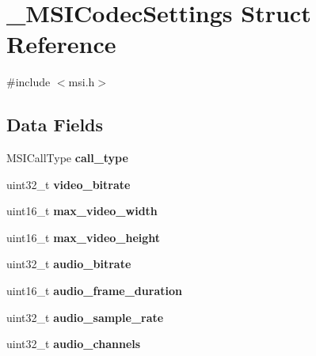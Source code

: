 \hypertarget{struct___m_s_i_codec_settings}{\section{\+\_\+\+M\+S\+I\+Codec\+Settings Struct Reference}
\label{struct___m_s_i_codec_settings}
}


{\ttfamily \#include $<$msi.\+h$>$}

\subsection*{Data Fields}
\begin{DoxyCompactItemize}
\item 
\hypertarget{struct___m_s_i_codec_settings_a24d841d0ab8a0b3f12f559aec494e4fe}{M\+S\+I\+Call\+Type {\bfseries call\+\_\+type}}\label{struct___m_s_i_codec_settings_a24d841d0ab8a0b3f12f559aec494e4fe}

\item 
\hypertarget{struct___m_s_i_codec_settings_af0eac99d4181795e8a595d244e745192}{uint32\+\_\+t {\bfseries video\+\_\+bitrate}}\label{struct___m_s_i_codec_settings_af0eac99d4181795e8a595d244e745192}

\item 
\hypertarget{struct___m_s_i_codec_settings_ab81ecded1f7c46e120c8f2afa7b2c5cc}{uint16\+\_\+t {\bfseries max\+\_\+video\+\_\+width}}\label{struct___m_s_i_codec_settings_ab81ecded1f7c46e120c8f2afa7b2c5cc}

\item 
\hypertarget{struct___m_s_i_codec_settings_a4fef4b2fa1a8ae8446314ad0af4ce698}{uint16\+\_\+t {\bfseries max\+\_\+video\+\_\+height}}\label{struct___m_s_i_codec_settings_a4fef4b2fa1a8ae8446314ad0af4ce698}

\item 
\hypertarget{struct___m_s_i_codec_settings_a5d9a8b59b2eb1eef8dbdcb032bf1dd01}{uint32\+\_\+t {\bfseries audio\+\_\+bitrate}}\label{struct___m_s_i_codec_settings_a5d9a8b59b2eb1eef8dbdcb032bf1dd01}

\item 
\hypertarget{struct___m_s_i_codec_settings_a61b592233f5a65705eb2600d38e365cd}{uint16\+\_\+t {\bfseries audio\+\_\+frame\+\_\+duration}}\label{struct___m_s_i_codec_settings_a61b592233f5a65705eb2600d38e365cd}

\item 
\hypertarget{struct___m_s_i_codec_settings_a66da4482e934a2700e07a39fa0838559}{uint32\+\_\+t {\bfseries audio\+\_\+sample\+\_\+rate}}\label{struct___m_s_i_codec_settings_a66da4482e934a2700e07a39fa0838559}

\item 
\hypertarget{struct___m_s_i_codec_settings_a1b04e9669a2929f425e867440b6d826d}{uint32\+\_\+t {\bfseries audio\+\_\+channels}}\label{struct___m_s_i_codec_settings_a1b04e9669a2929f425e867440b6d826d}

\end{DoxyCompactItemize}



